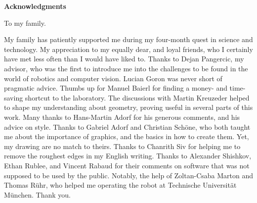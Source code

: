 \clearemptydoublepage
{}
{}	



\vspace*{2cm}

\begin{center}
{\Large \bf Acknowledgments}
\end{center}

\vspace{1cm}

\begin{center}
    To my family.
\vspace{1cm}
\end{center}


\vspace{1cm}


My family has patiently supported me during my four-month quest in science and
technology. My appreciation to my equally dear, and loyal friends, who I
certainly have met less often than I would have liked to.  Thanks to Dejan
Pangercic, my advisor, who was the first to introduce me into the challenges to
be found in the world of robotics and computer vision. Lucian Goron was never
short of pragmatic advice. Thumbs up for Manuel Baierl for finding a money- and
time-saving shortcut to the laboratory. The discussions with Martin Kreuzeder
helped to shape my understanding about geometry, proving useful in several
parts of this work.  Many thanks to Hans-Martin Adorf for his generous
comments, and his advice on style.  Thanks to Gabriel Adorf and Christian
Schöne, who both taught me about the importance of graphics, and the basics in
how to create them. Yet, my drawing are no match to theirs. Thanks to Chanrith
Siv for helping me to remove the roughest edges in my English writing. Thanks
to Alexander Shishkov, Ethan Rublee, and Vincent Rabaud for their comments on
software that was not supposed to be used by the public. Notably, the help of
Zoltan-Csaba Marton and Thomas Rühr, who helped me operating the robot at
Technische Universität München. Thank you.

